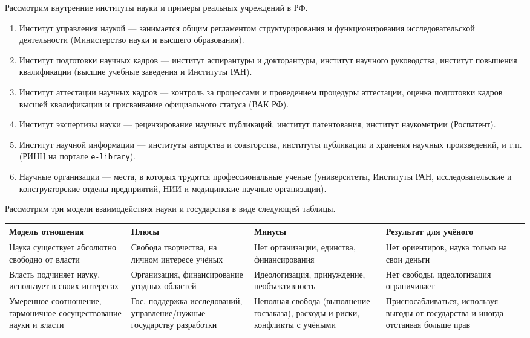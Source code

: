 Рассмотрим внутренние институты науки и примеры реальных учреждений в РФ.
\begin{enumerate}
\item Институт управления наукой --- занимается общим регламентом структурирования и функционирования исследовательской деятельности (Министерство науки и высшего образования).

\item Институт подготовки научных кадров --- институт аспирантуры и
докторантуры, институт научного руководства, институт повышения квалификации (высшие учебные заведения и Институты РАН). 

\item Институт аттестации научных кадров --- контроль за процессами и проведением процедуры аттестации, оценка подготовки кадров высшей квалификации и присваивание официального статуса 
(ВАК РФ). 

\item Институт экспертизы науки --- рецензирование научных публикаций, институт
патентования, институт наукометрии (Роспатент).

\item Институт научной информации --- институты авторства и соавторства, институты
публикации и хранения научных произведений, и т.п. (РИНЦ на портале \texttt{e-library}). 

\item Научные организации --- места, в которых трудятся профессиональные ученые (университеты, Институты РАН, исследовательские и конструкторские отделы предприятий, НИИ и
медицинские научные организации).
\end{enumerate}

Рассмотрим три модели взаимодействия науки и государства в виде следующей таблицы. 

\begin{table}[H]
\centering
\begin{tabular}{|p{4cm}|p{4cm}|p{4cm}|p{4cm}|}
\hline
\textbf{Модель отношения} &
\textbf{Плюсы} &
\textbf{Минусы} &
\textbf{Результат для учёного} \\ \hline
Наука существует абсолютно свободно от власти &
Свобода творчества, на личном интересе учёных &
Нет организации, единства, финансирования &
Нет ориентиров, наука только на свои деньги \\ \hline
Власть подчиняет науку, использует в своих интересах &
Организация, финансирование угодных областей &
Идеологизация, принуждение, необъективность &
Нет свободы, идеологизация ограничивает \\ \hline
Умеренное соотношение, гармоничное сосуществование науки и власти &
Гос. поддержка исследований, управление/нужные государству разработки &
Неполная свобода (выполнение госзаказа), расходы и риски, конфликты с учёными &
Приспосабливаться, используя выгоды от государства и иногда отстаивая больше прав \\ \hline
\end{tabular}
\label{table:science_and_power}
\end{table}

